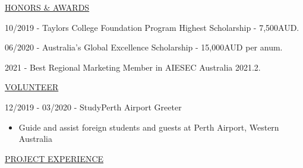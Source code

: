 \documentclass[11pt]{article}
\newcommand{\betteruline}[1]{
    \uline{#1}
}
\newcommand{\sectiontitle}[1]{
    \begingroup
        \titlebold
        \betteruline{\Large\uppercase{#1}  }
        \vspace{1.7mm}
    \endgroup
}
\newcommand{\sectioncontent}[1]{
    \begingroup
        \begin{FlushLeft}
        \vspace{-3mm}
        \sffamily\small#1
        \end{FlushLeft}
    \endgroup
    \vspace{2mm}
}
\newcommand{\honor}[2]{
    \textcolor{black!70}{#1} - #2 \\
    \vspace{1.5mm}
}
\begin{document}
\begin{paracol}{2}
    \sectiontitle{Honors \& Awards}
    \sectioncontent{
        \honor{10/2019}{Taylors College Foundation Program Highest Scholarship - 7,500AUD.}
        \vspace{2mm}
        \honor{06/2020}{ Australia's Global Excellence Scholarship - 15,000AUD per anum.}
        \vspace{2mm}
        \honor{2021}{ Best Regional Marketing Member in AIESEC Australia 2021.2.}

    }

    \sectiontitle{Volunteer}
    \sectioncontent{
    \honor{12/2019 - 03/2020}{StudyPerth Airport Greeter}
    \begin{itemize}
        \item Guide and assist foreign students and guests at Perth Airport, Western Australia
    \end{itemize}
    }

    \switchcolumn

    \sectiontitle{Project Experience}
    \sectioncontent{

}
\end{paracol}
\end{document}
